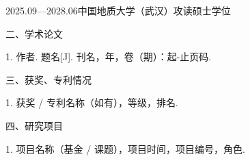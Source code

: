 \noindent\hspace*{0.226\textwidth}2025.09—2028.06\quad 中国地质大学（武汉）攻读硕士学位

\vspace{1.2em}
\noindent 二、学术论文

\vspace{0.5em}
1. 作者. 题名[J]. 刊名，年，卷（期）：起-止页码.

\vspace{1.2em}
\noindent 三、获奖、专利情况

\vspace{0.5em}
1. 获奖 / 专利名称（如有），等级，排名.

\vspace{1.2em}
\noindent 四、研究项目

\vspace{0.5em}
1. 项目名称（基金 / 课题），项目时间，项目编号，角色.

